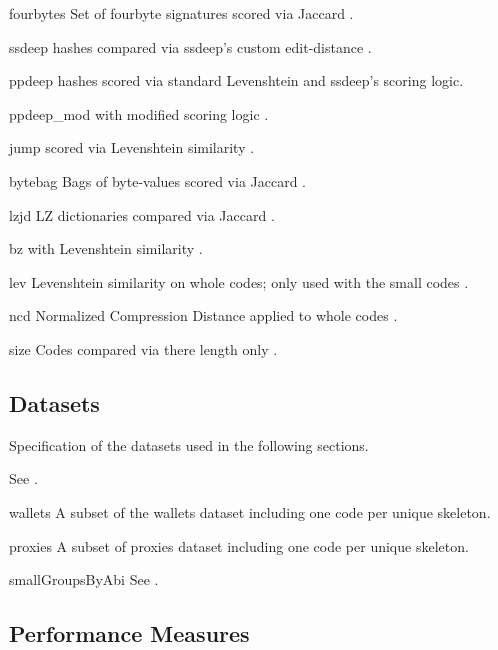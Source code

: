 \documentclass[../main.tex]{subfiles}
\begin{document}
\begin{desc}
  \item[fourbytes]
  Set of fourbyte signatures  scored via Jaccard .
  \item[ssdeep]
   hashes compared via ssdeep's custom edit-distance .
  \item[ppdeep]
    hashes scored via standard Levenshtein  and ssdeep's scoring logic.
  \item[ppdeep\_mod]
   with modified scoring logic .
  \item[jump]
    scored via Levenshtein similarity .
  \item[bytebag]
  Bags of byte-values  scored via Jaccard .
  \item[lzjd]
  LZ dictionaries compared via Jaccard .
  \item[bz]
    with Levenshtein similarity .
  \item[lev]
  Levenshtein similarity  on whole codes; only used with the small  codes .
  \item[ncd]
  Normalized Compression Distance applied to whole codes .
  \item[size]
  Codes compared via there length only .
\end{desc}

\subsection{Datasets}
Specification of the datasets used in the following sections.

\begin{desc}
  \item[\solcts] See .
  \item[wallets] A subset of the wallets dataset  including one code per unique skeleton.
  \item[proxies] A subset of proxies dataset  including one code per unique skeleton.
  \item[smallGroupsByAbi] See .
\end{desc}

\subsection{Performance Measures}
\end{document}
